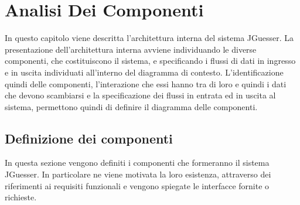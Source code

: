\section{Analisi Dei Componenti}
In questo capitolo viene descritta l'architettura interna del sistema JGuesser. La presentazione dell'architettura interna avviene individuando le diverse componenti, che costituiscono il sistema, e specificando i flussi di dati in ingresso e in uscita individuati all'interno del diagramma di contesto. L'identificazione quindi delle componenti, l'interazione che essi hanno tra di loro e quindi i dati che devono scambiarsi e la specificazione dei flussi in entrata ed in uscita al sistema, permettono quindi di definire il diagramma delle componenti. 

\subsection{Definizione dei componenti}
In questa sezione vengono definiti i componenti che formeranno il sistema JGuesser. In particolare ne viene motivata la loro esistenza, attraverso dei riferimenti ai requisiti funzionali e vengono spiegate le interfacce fornite o richieste. 

